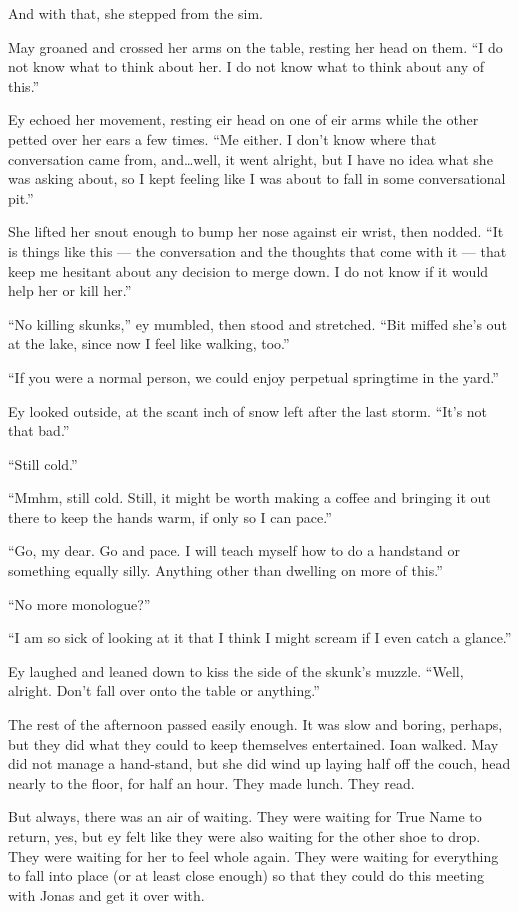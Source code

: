And with that, she stepped from the sim.

May groaned and crossed her arms on the table, resting her head on them. ``I do not know what to think about her. I do not know what to think about any of this.''

Ey echoed her movement, resting eir head on one of eir arms while the other petted over her ears a few times. ``Me either. I don't know where that conversation came from, and\ldots well, it went alright, but I have no idea what she was asking about, so I kept feeling like I was about to fall in some conversational pit.''

She lifted her snout enough to bump her nose against eir wrist, then nodded. ``It is things like this — the conversation and the thoughts that come with it — that keep me hesitant about any decision to merge down. I do not know if it would help her or kill her.''

``No killing skunks,'' ey mumbled, then stood and stretched. ``Bit miffed she's out at the lake, since now I feel like walking, too.''

``If you were a normal person, we could enjoy perpetual springtime in the yard.''

Ey looked outside, at the scant inch of snow left after the last storm. ``It's not that bad.''

``Still cold.''

``Mmhm, still cold. Still, it might be worth making a coffee and bringing it out there to keep the hands warm, if only so I can pace.''

``Go, my dear. Go and pace. I will teach myself how to do a handstand or something equally silly. Anything other than dwelling on more of this.''

``No more monologue?''

``I am so sick of looking at it that I think I might scream if I even catch a glance.''

Ey laughed and leaned down to kiss the side of the skunk's muzzle. ``Well, alright. Don't fall over onto the table or anything.''

The rest of the afternoon passed easily enough. It was slow and boring, perhaps, but they did what they could to keep themselves entertained. Ioan walked. May did not manage a hand-stand, but she did wind up laying half off the couch, head nearly to the floor, for half an hour. They made lunch. They read.

But always, there was an air of waiting. They were waiting for True Name to return, yes, but ey felt like they were also waiting for the other shoe to drop. They were waiting for her to feel whole again. They were waiting for everything to fall into place (or at least close enough) so that they could do this meeting with Jonas and get it over with.

